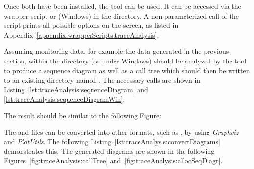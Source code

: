 \noindent Once both have been installed, the \KiekerTraceAnalysis{} tool can be %
used. It can be accessed via the wrapper-script  or %
 (Windows) in the  directory. A %
non-parameterized call of the script prints all possible options on the screen, %
as listed in Appendix~\ref{appendix:wrapperScripts:traceAnalysis}.

Assuming monitoring data, for example the data generated in the previous section, 
within the directory  (or  under Windows) %
should be analyzed by the tool to produce a sequence diagram as well as a call %
tree which should then be written to an existing directory named . %
The necessary calls are shown in Listing~\ref{lst:traceAnalysis:sequenceDiagram} and \ref{lst:traceAnalysis:sequenceDiagramWin}.

\setBashListing


The result should be similar to the following Figure:
\begin{figure}[H]
\begin{graybox}
\end{graybox}
\end{figure}

\noindent The  and  files can be converted into other formats, %
such as  , by using \textit{Graphviz} and \textit{PlotUtils}. %
The following Listing~\ref{lst:traceAnalysis:convertDiagrams} demonstrates this. %
The generated diagrams are shown in the following %
Figures~\ref{fig:traceAnalysis:callTree} and~\ref{fig:traceAnalysis:allocSeqDiagr}. 



